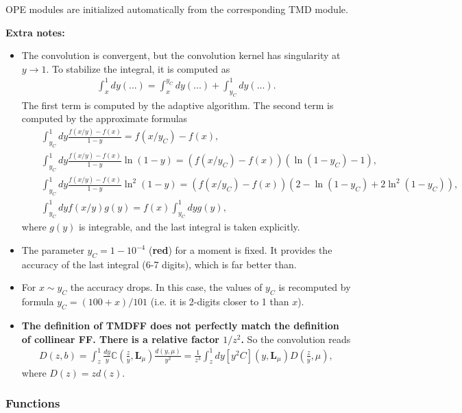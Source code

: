 \documentclass[prd,nofootinbib,eqsecnum,final]{revtex4}
\renewcommand{\(}{\left(}
\renewcommand{\)}{\right)}
\renewcommand{\[}{\left[}
\renewcommand{\]}{\right]}
\begin{document}
\begin{tcolorbox}
\begin{center}
OPE modules are initialized automatically from the corresponding TMD module.
\end{center}
\end{tcolorbox}

\textbf{Extra notes:}
\begin{itemize}
\item The convolution is convergent, but the convolution kernel has singularity at $y\to1$. To stabilize the integral, it is computed as
\begin{eqnarray}
\int_x^1 dy (...)=\int_x^{y_C} dy (...)+\int_{y_C}^1 dy (...).
\end{eqnarray}
The first term is computed by the adaptive algorithm. The second term is computed by the approximate formulas
\begin{eqnarray*}
&& \int_{y_C}^1 dy \frac{f(x/y)-f(x)}{1-y}=f(x/y_C)-f(x),
\\
&&\int_{y_C}^1 dy \frac{f(x/y)-f(x)}{1-y}\ln(1-y)=(f(x/y_C)-f(x))(\ln(1-y_C)-1),
\\
&&\int_{y_C}^1 dy \frac{f(x/y)-f(x)}{1-y}\ln^2(1-y)=(f(x/y_C)-f(x))(2-\ln(1-y_C)+2\ln^2(1-y_C)),
\\
&& \int_{y_C}^1 dy f(x/y)g(y)=f(x)\int_{y_C}^1 dy g(y),
\end{eqnarray*}
where $g(y)$ is integrable, and the last integral is taken explicitly.
\item The parameter $y_C=1-10^{-4}$ (\textbf{red}) for a moment is fixed. It provides the accuracy of the last integral (6-7 digits), which is far better than.
\item For $x\sim y_C$ the accuracy drops. In this case, the values of $y_C$ is recomputed by formula $y_C=(100+x)/101$ (i.e. it is 2-digits closer to 1 than $x$).
\item \textbf{The definition of TMDFF does not perfectly match the definition of collinear FF. There is a relative factor $1/z^2$.} So the convolution reads
\begin{eqnarray}
D(z,b)=\int_z^1 \frac{dy}{y}\mathbb{C}\(\frac{z}{y},\mathbf{L}_\mu\)\frac{d(y,\mu)}{y^2}=
\frac{1}{z^3}\int_z^1 dy [y^2C]\(y,\mathbf{L}_\mu\)D(\frac{z}{y},\mu),
\end{eqnarray}
where $D(z)=zd(z)$.
\end{itemize}

\subsubsection{Functions}
\end{document}
